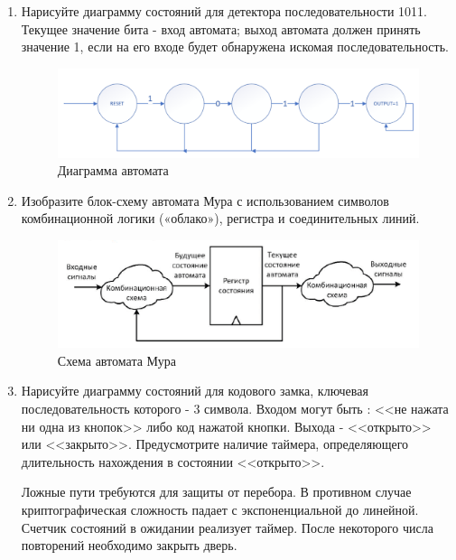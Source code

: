 \documentclass[a4paper,14pt]{article}
\begin{document}
	\begin{enumerate}
		\item Нарисуйте диаграмму состояний для детектора последовательности 1011. 
		Текущее значение бита - вход автомата; выход автомата должен принять значение 1, если на его входе будет обнаружена искомая последовательность.
		
		\begin{figure}[H]
			\centering
			\includegraphics[width=0.9\linewidth]{images/q_1}
			\caption{Диаграмма автомата}
			\label{fig:q_1}
		\end{figure}
	
		\item Изобразите блок-схему автомата Мура с использованием символов комбинационной логики («облако»), регистра и соединительных линий.
		
		\begin{figure}[H]
			\centering
			\includegraphics[width=0.9\linewidth]{images/q_2}
			\caption{Схема автомата Мура}
			\label{fig:q_2}
		\end{figure}
	
		\item Нарисуйте диаграмму состояний для кодового замка, ключевая последовательность	которого - 3 символа. 
		Входом могут быть : <<не нажата ни одна из кнопок>> либо код нажатой кнопки. 
		Выхода - <<открыто>> или <<закрыто>>. 
		Предусмотрите наличие таймера, определяющего длительность нахождения в состоянии <<открыто>>.
		
		Ложные пути требуются для защиты от перебора.
		В противном случае криптографическая сложность падает с экспоненциальной до линейной.
		Счетчик состояний в ожидании реализует таймер. 
		После некоторого числа повторений необходимо закрыть дверь.
		

\end{enumerate}
\end{document}
